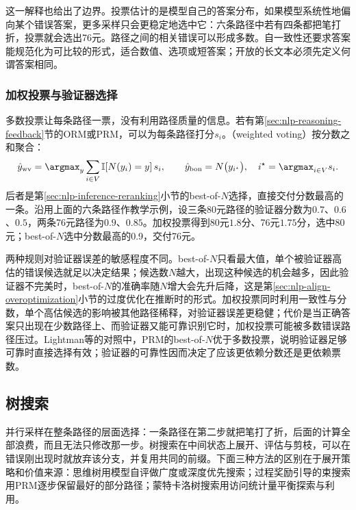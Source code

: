 这一解释也给出了边界。投票估计的是模型自己的答案分布，如果模型系统性地偏向某个错误答案，更多采样只会更稳定地选中它：六条路径中若有四条都把笔打折，投票就会选出76元。路径之间的相关错误可以形成多数。自一致性还要求答案能规范化为可比较的形式，适合数值、选项或短答案；开放的长文本必须先定义何谓答案相同。

\subsubsection{加权投票与验证器选择}
\label{sec:nlp-reasoning-weighted-voting}

多数投票让每条路径一票，没有利用路径质量的信息。若有第\ref{sec:nlp-reasoning-feedback}节的ORM或PRM，可以为每条路径打分$s_i$。（weighted voting）按分数之和聚合：
\begin{equation}
  \hat y_{\mathrm{wv}}=\argmax_y\sum_{i\in V}\mathbb I[N(y_i)=y]\,s_i,\qquad
  \hat y_{\mathrm{bon}}=N\bigl(y_{i^\star}\bigr),\quad i^\star=\argmax_{i\in V}s_i.
  \label{eq:nlp-reasoning-weighted-vote}
\end{equation}
后者是第\ref{sec:nlp-inference-reranking}小节的best-of-$N$选择，直接交付分数最高的一条。沿用上面的六条路径作教学示例，设三条80元路径的验证器分数为$0.7$、$0.6$、$0.5$，两条76元路径为$0.9$、$0.85$。加权投票得到80元$1.8$分、76元$1.75$分，选中80元；best-of-$N$选中分数最高的0.9，交付76元。

两种规则对验证器误差的敏感程度不同。best-of-$N$只看最大值，单个被验证器高估的错误候选就足以决定结果；候选数$N$越大，出现这种候选的机会越多，因此验证器不完美时，best-of-$N$的准确率随$N$增大会先升后降，这是第\ref{sec:nlp-align-overoptimization}小节的过度优化在推断时的形式。加权投票同时利用一致性与分数，单个高估候选的影响被其他路径稀释，对验证器误差更稳健；代价是当正确答案只出现在少数路径上、而验证器又能可靠识别它时，加权投票可能被多数错误路径压过。Lightman等的对照中，PRM的best-of-$N$优于多数投票，说明验证器足够可靠时直接选择有效；验证器的可靠性因而决定了应该更依赖分数还是更依赖票数。

\subsection{树搜索}
\label{sec:nlp-reasoning-tree-search}

并行采样在整条路径的层面选择：一条路径在第二步就把笔打了折，后面的计算全部浪费，而且无法只修改那一步。树搜索在中间状态上展开、评估与剪枝，可以在错误刚出现时就放弃该分支，并复用共同的前缀。下面三种方法的区别在于展开策略和价值来源：思维树用模型自评做广度或深度优先搜索；过程奖励引导的束搜索用PRM逐步保留最好的部分路径；蒙特卡洛树搜索用访问统计量平衡探索与利用。

